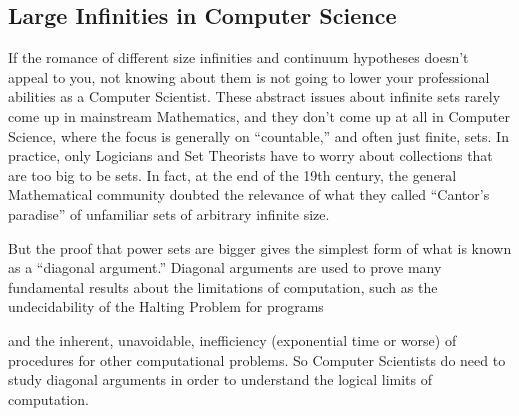 \subsection{Large Infinities in Computer Science}

If the romance of different size infinities and continuum hypotheses
doesn't appeal to you, not knowing about them is not going to lower your
professional abilities as a Computer Scientist.  These abstract issues
about infinite sets rarely come up in mainstream Mathematics, and they
don't come up at all in Computer Science, where the focus is generally on
``countable,'' and often just finite, sets.  In practice, only Logicians
and Set Theorists have to worry about collections that are too big to be
sets.  In fact, at the end of the 19th century, the general Mathematical
community doubted the relevance of what they called ``Cantor's paradise''
of unfamiliar sets of arbitrary infinite size.

But the proof that power sets are bigger gives the simplest form of what
is known as a ``diagonal argument.''  Diagonal arguments are used to prove
many fundamental results about the limitations of computation, such as the
undecidability of the Halting Problem for programs
\iffalse
(a variation of which is given in
\href{http://courses.csail.mit.edu/6.042/spring09/ps2.pdf#unrecognizable.set}
{Pset 2, prob 5})
\fi
and the inherent, unavoidable, inefficiency (exponential
time or worse) of procedures for other computational problems.  So
Computer Scientists do need to study diagonal arguments in order to
understand the logical limits of computation.

\begin{problems}
\classproblems
{}
\end{problems}

\newpage
